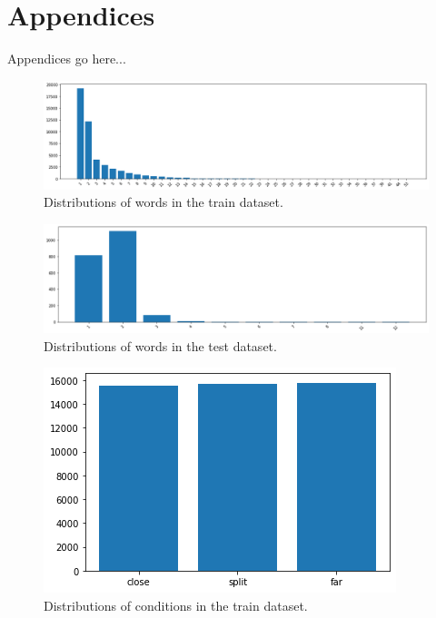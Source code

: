 \section{Appendices}
\label{sec:appendix}

Appendices go here...

\begin{figure}[ht]
\centering
\includegraphics[width=\textwidth]{assets/trainset_words.png}
\caption[Train dataset words]
{Distributions of words in the train dataset.}
\label{figure:trainset-words}
\end{figure}

\begin{figure}[ht]
\centering
\includegraphics[width=\textwidth]{assets/testset_words.png}
\caption[Test dataset words]
{Distributions of words in the test dataset.}
\label{figure:testset-words}
\end{figure}

\begin{figure}[hbt!]
\centering
\includegraphics[width=\columnwidth]{assets/trainset_conditions.png}
\caption[Train dataset words]
{Distributions of conditions in the train dataset.}
\label{figure:trainset-conditions}
\end{figure}


